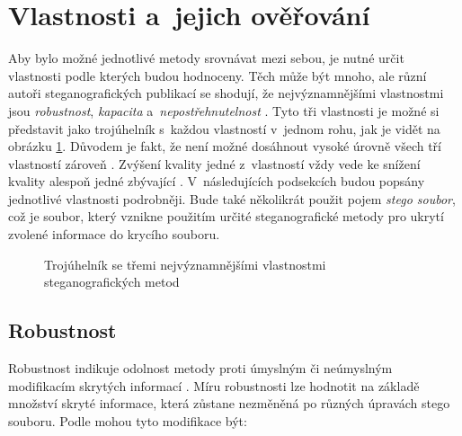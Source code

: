 \section{Vlastnosti a~jejich ověřování}
\label{sec:method-properties}

Aby bylo možné jednotlivé metody srovnávat mezi sebou, je nutné určit
vlastnosti podle kterých budou hodnoceny. Těch může být mnoho, ale různí autoři
steganografických publikací se shodují, že nejvýznamnějšími vlastnostmi jsou
\textit{robustnost}, \textit{kapacita} a~\textit{nepostřehnutelnost}
\cite{AlSabhany2020}\cite{Djebbar2012}\cite{Dutta2020}. Tyto tři vlastnosti je
možné si představit jako trojúhelník s~každou vlastností v~jednom rohu, jak je
vidět na obrázku \ref{pic:method-property-triangle}. Důvodem je fakt, že není
možné dosáhnout vysoké úrovně všech tří vlastností zároveň \cite{Dutta2020}.
Zvýšení kvality jedné z~vlastností vždy vede ke snížení kvality alespoň jedné
zbývající \cite{AlSabhany2020}\cite{Djebbar2012}. V~následujících podsekcích
budou popsány jednotlivé vlastnosti podrobněji. Bude také několikrát použit
pojem \textit{stego soubor}, což je soubor, který vznikne použitím určité
steganografické metody pro ukrytí zvolené informace do krycího souboru.

\begin{figure}[hbt]
    \centering
    \caption{Trojúhelník se třemi nejvýznamnějšími vlastnostmi
    steganografických metod}
    \label{pic:method-property-triangle}
\end{figure}

\subsection*{Robustnost}
\label{sub:robustness}

Robustnost indikuje odolnost metody proti úmyslným či neúmyslným modifikacím
skrytých informací \cite{AlSabhany2020}\cite{Dutta2020}. Míru robustnosti lze
hodnotit na základě množství skryté informace, která zůstane nezměněná po
různých úpravách stego souboru. Podle \cite{Djebbar2012} mohou tyto modifikace
být:

